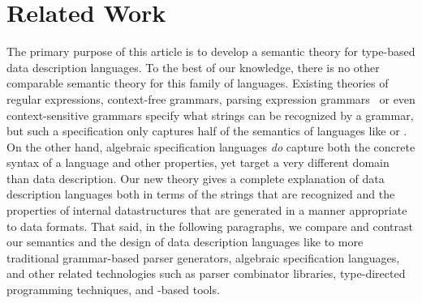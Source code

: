 \section{Related Work}
\label{sec:related}

The primary purpose of this article is to develop a semantic theory
for type-based data description languages.  To the best of our
knowledge, there is no other comparable semantic theory for this
family of languages.  Existing theories of regular expressions,
context-free grammars, parsing expression
grammars~\cite{birman+:parsing,ford:pegs,ford:packrat,grimm:packrat}
or even context-sensitive grammars specify what strings can be
recognized by a grammar, but such a specification only captures half
of the semantics of languages like \pads{} or \packettypes{}.  
On the other hand, algebraic specification languages \textit{do} capture both the concrete syntax of a language and other properties, yet  target a very different domain than data description.
Our new
theory gives a complete explanation of data description languages both in terms
of the strings that are recognized and the properties of internal
datastructures that are generated in a manner appropriate to data formats.  That said, in the following
paragraphs, we compare and contrast our semantics and the design
of data description languages like \pads{} to more
traditional
grammar-based parser generators, algebraic specification languages, and other related technologies
such as parser combinator libraries, 
type-directed programming techniques, and \xml{}-based tools.


